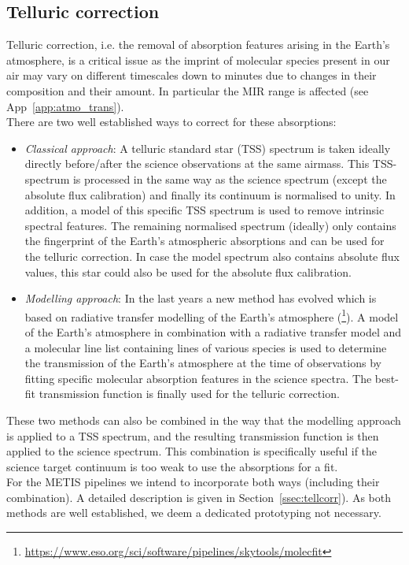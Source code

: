 \subsection{Telluric correction}
Telluric correction, i.e. the removal of absorption features arising in the Earth's atmosphere, is a critical issue as the imprint of molecular species present in our air may vary on different timescales down to minutes due to changes in their composition and their amount. In particular the \ac{MIR} range is affected (see App~\ref{app:atmo_trans}).\\
There are two well established ways to correct for these absorptions:
\begin{itemize}
    \item \textit{Classical approach}: A telluric standard star (\ac{TSS}) spectrum is taken ideally directly before/after the science observations at the same airmass. This \ac{TSS}-spectrum is processed in the same way as the science spectrum (except the absolute flux calibration) and finally its continuum is normalised to unity. In addition, a model of this specific \ac{TSS} spectrum is used to remove intrinsic spectral features. The remaining normalised spectrum (ideally) only contains the fingerprint of the Earth's atmospheric absorptions and can be used for the telluric correction. In case the model spectrum also contains absolute flux values, this star could also be used for the absolute flux calibration.
    \item \textit{Modelling approach}: In the last years a new method has evolved which is based on radiative transfer modelling of the Earth's atmosphere (\cite{mf1, mf2, molecfit}\footnote{\url{https://www.eso.org/sci/software/pipelines/skytools/molecfit}}). A model of the Earth's atmosphere in combination with a radiative transfer model and a molecular line list containing lines of various species is used to determine the transmission of the Earth's atmosphere at the time of observations by fitting specific molecular absorption features in the science spectra. The best-fit transmission function is finally used for the telluric correction.
\end{itemize}
These two methods can also be combined in the way that the modelling approach is applied to a \ac{TSS} spectrum, and the resulting transmission function is then applied to the science spectrum. This combination is specifically useful if the science target continuum is too weak to use the absorptions for a fit.\\
For the \ac{METIS} pipelines we intend to incorporate both ways (including their combination). A detailed description is given in Section~\ref{ssec:tellcorr}). As both methods are well established, we deem a dedicated prototyping not necessary.

